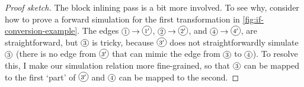 \begin{theorem}
\begin{proof}[Proof sketch]
    The block inlining pass is a bit more involved.  To see why, consider how to
    prove a forward simulation for the first transformation in
    \cref{fig:if-conversion-example}. The edges
    $\diaglabel{$1$}\rightarrow\diaglabel{$1^\prime$}$,
    $\diaglabel{$2$}\rightarrow\diaglabel{$2^\prime$}$, and
    $\diaglabel{$4$}\rightarrow\diaglabel{$4^\prime$}$, are straightforward, but
    $\diaglabel{$3$}$ is tricky, because $\diaglabel{$3^\prime$}$ does not
    straightforwardly simulate $\diaglabel{$3$}$ (there is no edge from
    $\diaglabel{$3^\prime$}$ that can mimic the edge from $\diaglabel{$3$}$ to
    $\diaglabel{$4$}$). To resolve this, I make our simulation relation more
    fine-grained, so that $\diaglabel{$3$}$ can be mapped to the first `part' of
    $\diaglabel{$3^\prime$}$ and $\diaglabel{$4$}$ can be mapped to the second.

  \end{proof}
\end{theorem}

